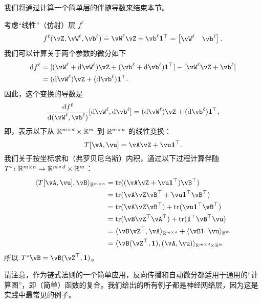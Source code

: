 \documentclass[../../book-main.tex]{subfiles}
\begin{document}
我们将通过计算一个简单层的伴随导数来结束本节。
\begin{example}
    考虑“线性”（仿射）层 \(f^{\ell}\)
    \begin{equation}
        f^{\ell}(\vZ, \vW^{\ell}, \vb^{\ell}) \doteq \vW^{\ell}\vZ + \vb^{\ell}\vone^{\top} = \mat{\vW^{\ell} & \vb^{\ell}}.
    \end{equation}
    我们可以计算关于两个参数的微分如下
    \begin{align}
        \odif{f}^{\ell}
        &= [(\vW^{\ell} + \odif{\vW}^{\ell})\vZ + (\vb^{\ell} + \odif{\vb}^{\ell})\vone^{\top}] - [\vW^{\ell}\vZ + \vb^{\ell}] \\ 
        &= (\odif{\vW}^{\ell})\vZ + (\odif{\vb}^{\ell})\vone^{\top}.
    \end{align}
    因此，这个变换的导数是
    \begin{equation}
        \odv{f^{\ell}}{(\vW^{\ell}, \vb^{\ell})}[\odif{\vW}^{\ell}, \odif{\vb}^{\ell}] = (\odif{\vW}^{\ell})\vZ + (\odif{\vb}^{\ell})\vone^{\top},
    \end{equation}
    即，表示以下从 \(\mathbb{R}^{m \times d} \times \mathbb{R}^{m}\) 到 \(\mathbb{R}^{m \times n}\) 的线性变换：
    \begin{equation}
        T[\vA, \vu] = \vA\vZ + \vu\vone^{\top}.
    \end{equation}
    我们关于按坐标求和（弗罗贝尼乌斯）内积，通过以下过程计算伴随 \(T^{*} \colon \mathbb{R}^{m \times n} \to \mathbb{R}^{m \times d} \times \mathbb{R}^{m}\)：
    \begin{align}
        \ip{T[\vA, \vu]}{\vB}_{\R^{m \times n}} 
        &= \tr((\vA\vZ + \vu\vone^{\top})\vB^{\top}) \\
        &= \tr(\vA\vZ\vB^{\top} + \vu\vone^{\top}\vB^{\top}) \\
        &= \tr(\vA\vZ\vB^{\top}) + \tr(\vu\vone^{\top}\vB^{\top}) \\
        &= \tr(\vB\vZ^{\top}\vA^{\top}) + \tr(\vone^{\top}\vB^{\top}\vu) \\
        &= \ip{\vB\vZ^{\top}}{\vA}_{\R^{m \times d}} + \ip{\vB\vone}{\vu}_{\R^{m}} \\
        &= \ip{\vB(\vZ^{\top}, \vone)}{(\vA, \vu)}_{\R^{m \times d} \times \R^{m}}
    \end{align}
    所以 \(T^{*}\vB = \vB(\vZ^{\top}, \vone)\)。
\end{example}

请注意，作为链式法则的一个简单应用，反向传播和自动微分都适用于通用的“计算图”，即（简单）函数的复合。我们给出的所有例子都是神经网络层，因为这是实践中最常见的例子。
\end{document}

